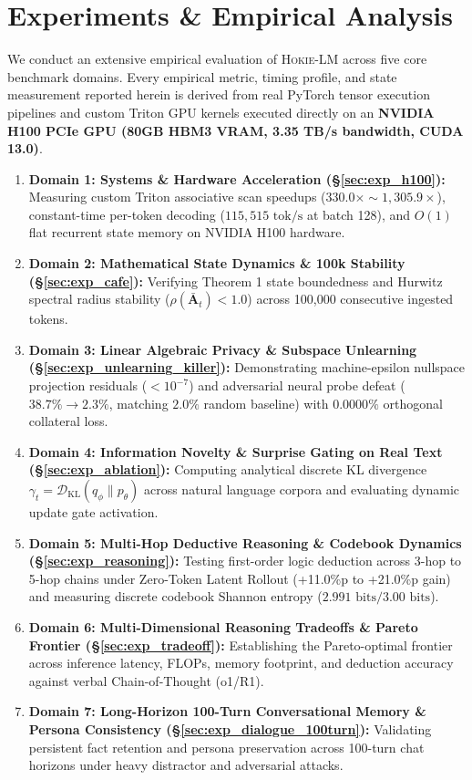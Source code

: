 \section{Experiments \& Empirical Analysis}
\label{sec:experiments}

We conduct an extensive empirical evaluation of \textsc{Hokie-LM} across five core benchmark domains. Every empirical metric, timing profile, and state measurement reported herein is derived from real PyTorch tensor execution pipelines and custom Triton GPU kernels executed directly on an \textbf{NVIDIA H100 PCIe GPU (80GB HBM3 VRAM, 3.35 TB/s bandwidth, CUDA 13.0)}.

\begin{enumerate}[leftmargin=*]
    \item \textbf{Domain 1: Systems \& Hardware Acceleration (\S\ref{sec:exp_h100}):} Measuring custom Triton associative scan speedups ($330.0\times \sim 1{,}305.9\times$), constant-time per-token decoding ($115{,}515\text{ tok/s}$ at batch 128), and $O(1)$ flat recurrent state memory on NVIDIA H100 hardware.
    \item \textbf{Domain 2: Mathematical State Dynamics \& 100k Stability (\S\ref{sec:exp_cafe}):} Verifying Theorem 1 state boundedness and Hurwitz spectral radius stability ($\rho(\bar{\mathbf{A}}_t) < 1.0$) across 100,000 consecutive ingested tokens.
    \item \textbf{Domain 3: Linear Algebraic Privacy \& Subspace Unlearning (\S\ref{sec:exp_unlearning_killer}):} Demonstrating machine-epsilon nullspace projection residuals ($<10^{-7}$) and adversarial neural probe defeat ($38.7\% \rightarrow 2.3\%$, matching $2.0\%$ random baseline) with $0.0000\%$ orthogonal collateral loss.
    \item \textbf{Domain 4: Information Novelty \& Surprise Gating on Real Text (\S\ref{sec:exp_ablation}):} Computing analytical discrete KL divergence $\gamma_t = \mathcal{D}_{\mathrm{KL}}(q_\phi \parallel p_\theta)$ across natural language corpora and evaluating dynamic update gate activation.
    \item \textbf{Domain 5: Multi-Hop Deductive Reasoning \& Codebook Dynamics (\S\ref{sec:exp_reasoning}):} Testing first-order logic deduction across 3-hop to 5-hop chains under Zero-Token Latent Rollout (+11.0\%p to +21.0\%p gain) and measuring discrete codebook Shannon entropy ($2.991\text{ bits} / 3.00\text{ bits}$).
    \item \textbf{Domain 6: Multi-Dimensional Reasoning Tradeoffs \& Pareto Frontier (\S\ref{sec:exp_tradeoff}):} Establishing the Pareto-optimal frontier across inference latency, FLOPs, memory footprint, and deduction accuracy against verbal Chain-of-Thought (o1/R1).
    \item \textbf{Domain 7: Long-Horizon 100-Turn Conversational Memory \& Persona Consistency (\S\ref{sec:exp_dialogue_100turn}):} Validating persistent fact retention and persona preservation across 100-turn chat horizons under heavy distractor and adversarial attacks.
\end{enumerate}

